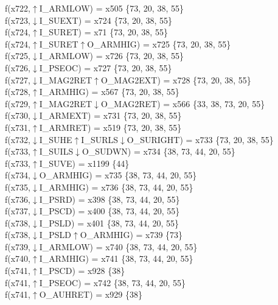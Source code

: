 f(x722,$\uparrow$I\_ARMLOW) = x505 \{73, 20, 38, 55\} \\  
f(x723,$\downarrow$I\_SUEXT) = x724 \{73, 20, 38, 55\} \\  
f(x724,$\uparrow$I\_SURET) = x71 \{73, 20, 38, 55\} \\  
f(x724,$\uparrow$I\_SURET$\uparrow$O\_ARMHIG) = x725 \{73, 20, 38, 55\} \\  
f(x725,$\downarrow$I\_ARMLOW) = x726 \{73, 20, 38, 55\} \\  
f(x726,$\downarrow$I\_PSEOC) = x727 \{73, 20, 38, 55\} \\  
f(x727,$\downarrow$I\_MAG2RET$\uparrow$O\_MAG2EXT) = x728 \{73, 20, 38, 55\} \\  
f(x728,$\uparrow$I\_ARMHIG) = x567 \{73, 20, 38, 55\} \\  
f(x729,$\uparrow$I\_MAG2RET$\downarrow$O\_MAG2RET) = x566 \{33, 38, 73, 20, 55\} \\  
f(x730,$\downarrow$I\_ARMEXT) = x731 \{73, 20, 38, 55\} \\  
f(x731,$\uparrow$I\_ARMRET) = x519 \{73, 20, 38, 55\} \\  
f(x732,$\downarrow$I\_SUHE$\uparrow$I\_SURLS$\downarrow$O\_SURIGHT) = x733 \{73, 20, 38, 55\} \\  
f(x733,$\uparrow$I\_SUILS$\downarrow$O\_SUDWN) = x734 \{38, 73, 44, 20, 55\} \\  
f(x733,$\uparrow$I\_SUVE) = x1199 \{44\} \\  
f(x734,$\downarrow$O\_ARMHIG) = x735 \{38, 73, 44, 20, 55\} \\  
f(x735,$\downarrow$I\_ARMHIG) = x736 \{38, 73, 44, 20, 55\} \\  
f(x736,$\downarrow$I\_PSRD) = x398 \{38, 73, 44, 20, 55\} \\  
f(x737,$\downarrow$I\_PSCD) = x400 \{38, 73, 44, 20, 55\} \\  
f(x738,$\downarrow$I\_PSLD) = x401 \{38, 73, 44, 20, 55\} \\  
f(x738,$\downarrow$I\_PSLD$\uparrow$O\_ARMHIG) = x739 \{73\} \\  
f(x739,$\downarrow$I\_ARMLOW) = x740 \{38, 73, 44, 20, 55\} \\  
f(x740,$\uparrow$I\_ARMHIG) = x741 \{38, 73, 44, 20, 55\} \\  
f(x741,$\uparrow$I\_PSCD) = x928 \{38\} \\  
f(x741,$\uparrow$I\_PSEOC) = x742 \{38, 73, 44, 20, 55\} \\  
f(x741,$\uparrow$O\_AUHRET) = x929 \{38\} \\  
